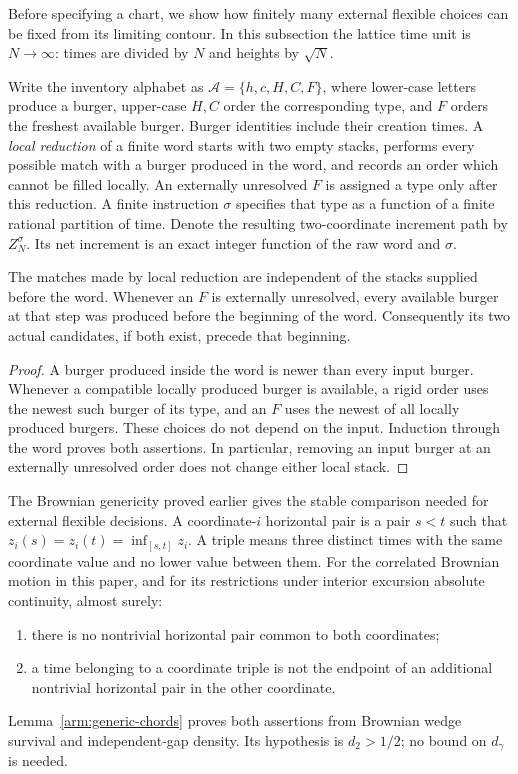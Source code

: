Before specifying a chart, we show how finitely many external flexible
choices can be fixed from its limiting contour. In this subsection the
lattice time unit is $N\to\infty$: times are divided by $N$ and heights
by $\sqrt N$.

Write the inventory alphabet as
$\mathcal A=\{h,c,H,C,F\}$, where lower-case letters produce a burger,
upper-case $H,C$ order the corresponding type, and $F$ orders the freshest
available burger.  Burger identities include their creation times.  A
\emph{local reduction} of a finite word starts with two empty stacks,
performs every possible match with a burger produced in the word, and
records an order which cannot be filled locally.  An externally unresolved
$F$ is assigned a type only after this reduction.  A finite instruction
$\sigma$ specifies that type as a function of a finite rational partition
of time.  Denote the resulting two-coordinate increment path by
$Z_N^{\sigma}$.  Its net increment is an exact integer function of the
raw word and $\sigma$.

\begin{lemma}\label{loc:local-reduction}
The matches made by local reduction are independent of the stacks supplied
before the word.  Whenever an $F$ is externally unresolved, every available
burger at that step was produced before the beginning of the word.
Consequently its two actual candidates, if both exist, precede that
beginning.
\end{lemma}
\begin{proof}
A burger produced inside the word is newer than every input burger.
Whenever a compatible locally produced burger is available, a rigid order
uses the newest such burger of its type, and an $F$ uses the newest of all
locally produced burgers.  These choices do not depend on the input.
Induction through the word proves both assertions.  In particular, removing
an input burger at an externally unresolved order does not change either
local stack.
\end{proof}

The Brownian genericity proved earlier gives the stable comparison needed
for external flexible decisions.  A coordinate-$i$ horizontal pair is a pair $s<t$ such that
$z_i(s)=z_i(t)=\inf_{[s,t]}z_i$.  A triple means three distinct times with
the same coordinate value and no lower value between them.  For the
correlated Brownian motion in this paper, and for its restrictions under
interior excursion absolute continuity, almost surely:
\begin{enumerate}[label=(\roman*)]
\item there is no nontrivial horizontal pair common to both coordinates;
\item a time belonging to a coordinate triple is not the endpoint of an
additional nontrivial horizontal pair in the other coordinate.
\end{enumerate}
Lemma~\ref{arm:generic-chords} proves both assertions from Brownian wedge
survival and independent-gap density. Its hypothesis is $d_2>1/2$; no
bound on $d_\gamma$ is needed.


